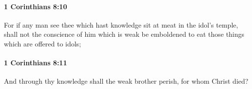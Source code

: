 		\paragraph{1 Corinthians 8:10} %
			\label{1CORINTHIANS-8-10}

			For if any man see thee which hast knowledge sit at meat in the idol's temple, shall not the conscience of him which is weak be emboldened to eat those things which are offered to idols;

			\begin{framed}
			\scriptsize
				\begin{compactdesc}
					\item[SBLG] 
				\end{compactdesc}
			\end{framed}

		\paragraph{1 Corinthians 8:11} %
			\label{1CORINTHIANS-8-11}

			And through thy knowledge shall the weak brother perish, for whom Christ died?

